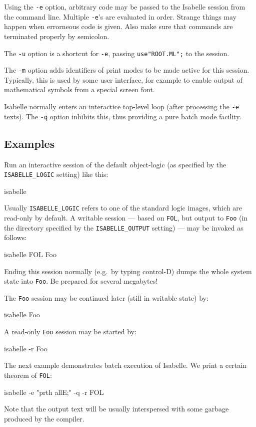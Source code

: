 \medskip Using the \texttt{-e} option, arbitrary {\ML} code may be
passed to the Isabelle session from the command line. Multiple
\texttt{-e}'s are evaluated in order. Strange things may happen when
errorneous {\ML} code is given. Also make sure that commands are
terminated properly by semicolon.

\medskip The \texttt{-u} option is a shortcut for \texttt{-e}, passing
\texttt{use"ROOT.ML";} to the {\ML} session.

\medskip The \texttt{-m} option adds identifiers of print modes to be
made active for this session. Typically, this is used by some user
interface, for example to enable output of mathematical symbols from a
special screen font.

\medskip Isabelle normally enters an interactice {\ML} top-level loop
(after processing the \texttt{-e} texts). The \texttt{-q} option
inhibits this, thus providing a pure batch mode facility.


\subsection*{Examples}

Run an interactive session of the default object-logic (as specified
by the \texttt{ISABELLE_LOGIC} setting) like this:
\begin{ttbox}
isabelle
\end{ttbox}
Usually \texttt{ISABELLE_LOGIC} refers to one of the standard logic
images, which are read-only by default.  A writable session --- based
on \texttt{FOL}, but output to \texttt{Foo} (in the directory
specified by the \texttt{ISABELLE_OUTPUT} setting) --- may be invoked
as follows:
\begin{ttbox}
isabelle FOL Foo
\end{ttbox}
Ending this session normally (e.g.\ by typing control-D) dumps the
whole {\ML} system state into \texttt{Foo}. Be prepared for several
megabytes!

The \texttt{Foo} session may be continued later (still in writable
state) by:
\begin{ttbox}
isabelle Foo
\end{ttbox}
A read-only \texttt{Foo} session may be started by:
\begin{ttbox}
isabelle -r Foo
\end{ttbox}

\medskip The next example demonstrates batch execution of Isabelle. We
print a certain theorem of \texttt{FOL}:
\begin{ttbox}
isabelle -e "prth allE;" -q -r FOL
\end{ttbox}
Note that the output text will be usually interspersed with some
garbage produced by the {\ML} compiler.


